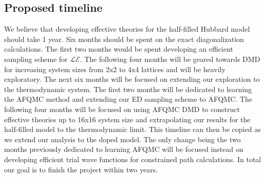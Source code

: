 \documentclass[12pt]{article}
\begin{document}
\subsection{Proposed timeline}
We believe that developing effective theories for the half-filled Hubbard model should take 1 year. 
Six months should be spent on the exact diagonalization calculations. 
The first two months would be spent developing an efficient sampling scheme for $\mathcal{LE}$.
The following four months will be geared towards DMD for increasing system sizes from 2x2 to 4x4 lattices and will be heavily exploratory.
The next six months will be focused on extending our exploration to the thermodynamic system.
The first two months will be dedicated to learning the AFQMC method and extending our ED sampling scheme to AFQMC.
The following four months will be focused on using AFQMC DMD to construct effective theories up to 16x16 system size and extrapolating our results for the half-filled model to the thermodynamic limit.
This timeline can then be copied as we extend our analysis to the doped model. 
The only change being the two months previously dedicated to learning AFQMC will be focused instead on developing efficient trial wave functions for constrained path calculations.
In total our goal is to finish the project within two years.
\end{document}
